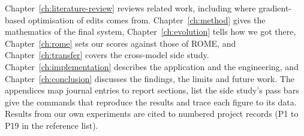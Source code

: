 Chapter~\ref{ch:literature-review} reviews related work, including where gradient-based optimisation of edits comes from. Chapter~\ref{ch:method} gives the mathematics of the final system, Chapter~\ref{ch:evolution} tells how we got there, Chapter~\ref{ch:rome} sets our scores against those of ROME, and Chapter~\ref{ch:transfer} covers the cross-model side study. Chapter~\ref{ch:implementation} describes the application and the engineering, and Chapter~\ref{ch:conclusion} discusses the findings, the limits and future work. The appendices map journal entries to report sections, list the side study's pass bars give the commands that reproduce the results and trace each figure to its data. Results from our own experiments are cited to numbered project records (P1 to P19 in the reference list).

